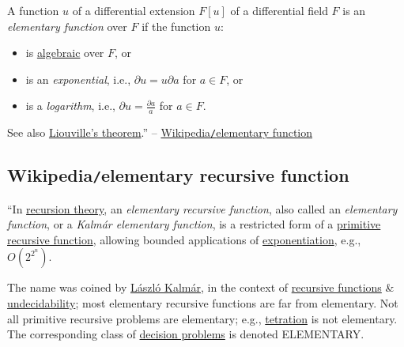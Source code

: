 \documentclass{article}
\begin{document}
A function $u$ of a differential extension $F[u]$ of a differential field $F$ is an {\it elementary function} over $F$ if the function $u$:
\begin{itemize}
	\item is \href{https://en.wikipedia.org/wiki/Algebraic_function}{algebraic} over $F$, or
	\item is an {\it exponential}, i.e., $\partial u = u\partial a$ for $a\in F$, or
	\item is a {\it logarithm}, i.e., $\partial u = \frac{\partial a}{a}$ for $a\in F$.
\end{itemize}
See also \href{https://en.wikipedia.org/wiki/Liouville%27s_theorem_(differential_algebra)}{Liouville's theorem}.'' -- \href{https://en.wikipedia.org/wiki/Elementary_function}{Wikipedia{\tt/}elementary function}


\subsection{Wikipedia{\tt/}elementary recursive function}
``In \href{https://en.wikipedia.org/wiki/Recursion_theory}{recursion theory}, an {\it elementary recursive function}, also called an {\it elementary function}, or a {\it Kalm\'ar elementary function}, is a restricted form of a \href{https://en.wikipedia.org/wiki/Primitive_recursive_function}{primitive recursive function}, allowing bounded applications of \href{https://en.wikipedia.org/wiki/Exponentiation}{exponentiation}, e.g., $O(2^{2^n})$.

The name was coined by \href{https://en.wikipedia.org/wiki/L%C3%A1szl%C3%B3_Kalm%C3%A1r}{\sc L\'aszl\'o Kalm\'ar}, in the context of \href{https://en.wikipedia.org/wiki/Computable_function}{recursive functions} \& \href{https://en.wikipedia.org/wiki/Undecidable_problem}{undecidability}; most elementary recursive functions are far from elementary. Not all primitive recursive problems are elementary; e.g., \href{https://en.wikipedia.org/wiki/Tetration}{tetration} is not elementary. The corresponding class of \href{https://en.wikipedia.org/wiki/Decision_problem}{decision problems} is denoted {\sf ELEMENTARY}.
\end{document}
